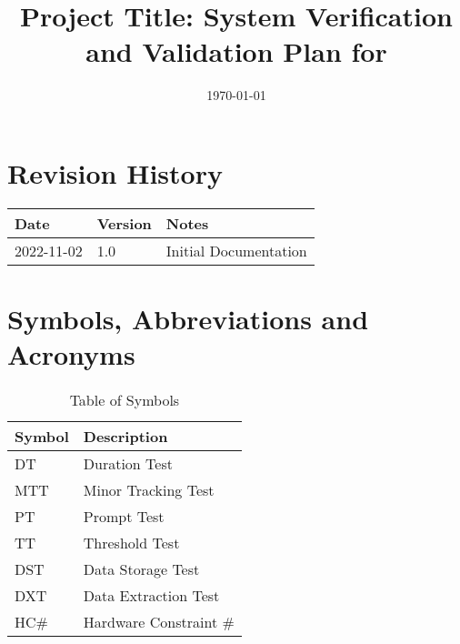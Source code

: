\documentclass[12pt, titlepage]{article}
\begin{document}
\title{Project Title: System Verification and Validation Plan for \progname{}}
\author{\authname}
\date{\today}

\maketitle


\section{Revision History}

\begin{tabularx}{\textwidth}{p{3cm}p{2cm}X}

  \toprule {\bf Date} & {\bf Version} & {\bf Notes}           \\
  \midrule
  2022-11-02          & 1.0           & Initial Documentation \\
  \bottomrule
\end{tabularx}

\newpage

\tableofcontents

\listoftables
{}

\listoffigures
{}

\newpage

\section{Symbols, Abbreviations and Acronyms}
\renewcommand{\arraystretch}{1.2}

\begin{table}[H]
	\begin{tabular}{l l} 
		  \toprule		
			  \textbf{Symbol} & \textbf{Description}\\
			  \midrule 
			  DT 						& Duration Test\\
			  MTT 					& Minor Tracking Test\\
			  PT 						& Prompt Test\\
			  TT 						& Threshold Test\\
			  DST 					& Data Storage Test\\
			  DXT 					& Data Extraction Test\\
			  HC\#					& Hardware Constraint \#\\ 
		  \bottomrule
	\end{tabular}\\\\
\caption{\label{Syb}Table of Symbols}
\end{table}
\end{document}
